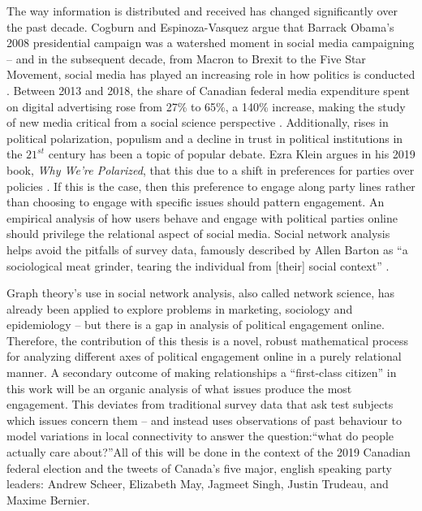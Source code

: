 The way information is distributed and received has changed significantly over
the past decade. Cogburn and Espinoza-Vasquez argue that Barrack Obama’s 2008
presidential campaign was a watershed moment in social media campaigning -- and
in the subsequent decade, from Macron to Brexit to the Five Star Movement,
social media has played an increasing role in how politics is conducted
\cite{cogburn2011networked}. Between 2013 and 2018, the share of Canadian
federal media expenditure spent on digital advertising rose from 27\% to 65\%, a
140\% increase, making the study of new media critical from a social science
perspective \cite{annualReportCanadaAdvertisingActivities_2018}. Additionally,
rises in political polarization, populism and a decline in trust in political
institutions in the $21^{st}$ century has been a topic of popular debate. Ezra
Klein argues in his 2019 book, \emph{Why We're Polarized}, that this due to a
shift in preferences for parties over policies \cite{levitsky2018democracies}.
If this is the case, then this preference to engage along party lines rather
than choosing to engage with specific issues should pattern engagement. An
empirical analysis of how users behave and engage with political parties online
should privilege the relational aspect of social media. Social network analysis
helps avoid the pitfalls of survey data, famously described by Allen Barton as
``a sociological meat grinder, tearing the individual from [their] social
context'' \cite{freeman2004development}.

Graph theory’s use in social network analysis, also called network science, has
already been applied to explore problems in marketing, sociology and
epidemiology -- but there is a gap in analysis of political engagement online.
Therefore, the contribution of this thesis is a novel, robust mathematical
process for analyzing different axes of political engagement online in a purely
relational manner. A secondary outcome of making relationships a “first-class
citizen” in this work will be an organic analysis of what issues produce the
most engagement. This deviates from traditional survey data that ask test
subjects which issues concern them -- and instead uses observations of past
behaviour to model variations in local connectivity to answer the question:“what
do people actually care about?”All of this will be done in the context of the
2019 Canadian federal election and the tweets of Canada's five major, english
speaking party leaders: Andrew Scheer, Elizabeth May, Jagmeet Singh, Justin
Trudeau, and Maxime Bernier. 

